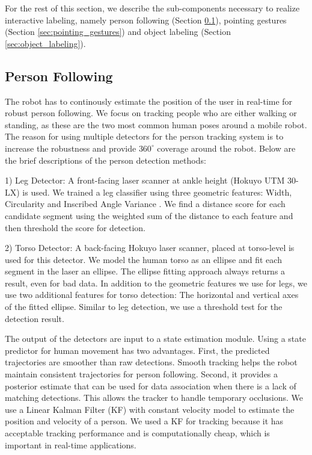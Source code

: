 \documentclass{tADR2e}
\begin{document}
For the rest of this section, we describe the sub-components necessary to realize interactive labeling, namely person following (Section \ref{sec:person_following}), pointing gestures (Section \ref{sec:pointing_gestures}) and object labeling (Section \ref{sec:object_labeling}).

\subsection{Person Following}
\label{sec:person_following}

The robot has to continously estimate the position of the user in real-time for robust person following. We focus on tracking people who are either walking or standing, as these are the two most common human poses around a mobile robot. The reason for using multiple detectors for the person tracking system is to increase the robustness and provide $360^{\circ}$ coverage around the robot. Below are the brief descriptions of the person detection methods:

1) Leg Detector: A front-facing laser scanner at ankle height (Hokuyo UTM 30-LX) is used. We trained a leg classifier using three geometric features: Width, Circularity and Inscribed Angle Variance \cite{xavier2005fast}. We find a distance score for each candidate segment using the weighted sum of the distance to each feature and then threshold the score for detection.

2) Torso Detector: A back-facing Hokuyo laser scanner, placed at torso-level
is used for this detector. We model
the human torso as an ellipse and fit each segment in the laser an ellipse. The ellipse fitting approach always returns a result, even for bad data. In addition to the geometric features we use for legs, we use two additional features for torso detection: The horizontal and vertical axes of the fitted ellipse. Similar to leg detection, we use a threshold test for the detection result.

The output of the detectors are input to a state estimation module. Using a state predictor for human movement has two advantages. First, the predicted trajectories are smoother than
raw detections. Smooth tracking helps the robot maintain consistent trajectories
for person following. Second, it provides a posterior estimate that can be used for data association when there is a lack of
matching detections. This allows the tracker to handle temporary occlusions. We use
a Linear Kalman Filter (KF) with constant velocity model to estimate the position and velocity of a person. We used a KF for tracking because it has acceptable tracking performance and is computationally cheap, which is important in real-time applications.
\end{document}
